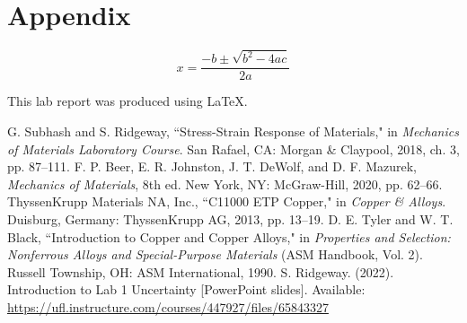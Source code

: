 \documentclass[10pt,journal,letterpaper]{IEEEtran}
\begin{document}
\lipsum[21]

\section*{Appendix}

\lipsum[22-24]
\begin{equation}
x=\frac{-b\pm\sqrt{b^2-4ac}}{2a}
\end{equation}
\lipsum[25]

\hfill\break
\noindent
This lab report was produced using \LaTeX.

\begin{thebibliography}{00}
 G. Subhash and S. Ridgeway, ``Stress-Strain Response of Materials," in \textit{Mechanics of Materials Laboratory Course}. San Rafael, CA: Morgan \& Claypool, 2018, ch. 3, pp. 87--111.
 F. P. Beer, E. R. Johnston, J. T. DeWolf, and D. F. Mazurek, \textit{Mechanics of Materials}, 8th ed. New York, NY: McGraw-Hill, 2020, pp. 62--66.
  ThyssenKrupp Materials NA, Inc., ``C11000 ETP Copper," in \textit{Copper \& Alloys}. Duisburg, Germany: ThyssenKrupp AG, 2013, pp. 13--19. 
 D. E. Tyler and W. T. Black, ``Introduction to Copper and Copper Alloys," in \textit{Properties and Selection: Nonferrous Alloys and Special-Purpose Materials} (ASM Handbook, Vol. 2). Russell Township, OH: ASM International, 1990.
 S. Ridgeway. (2022). Introduction to Lab 1 Uncertainty [PowerPoint slides]. Available: \url{https://ufl.instructure.com/courses/447927/files/65843327}
\end{thebibliography}
\end{document}
